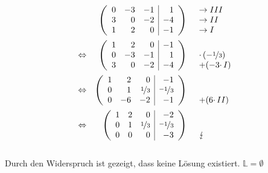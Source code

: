\begin{equation*}
  \begin{array}{ c r l }
    & \left(\begin{array}{rrr|r}
      0 & -3 & -1 & 1\\
      3 & 0 & -2 & -4\\
      1 & 2 & 0 & -1
    \end{array}\right) & \begin{array}{ l }
      \rightarrow III\\
      \rightarrow II\\
      \rightarrow I
    \end{array}\vspace{2mm}\\
    \Leftrightarrow  & \left(\begin{array}{rrr|r}
      1 & 2 & 0 & -1\\
      0 & -3 & -1 & 1\\
      3 & 0 & -2 & -4
    \end{array}\right) & \begin{array}{ l }
      \\
      \cdotp ( -\nicefrac{1}{3})\\
      +( -3\cdotp I)
    \end{array}\vspace{2mm}\\
    \Leftrightarrow  & \left(\begin{array}{rrr|r}
      1 & 2 & 0 & -1\\
      0 & 1 & \nicefrac{1}{3} & \nicefrac{-1}{3}\\
      0 & -6 & -2 & -1
    \end{array}\right) & \begin{array}{ l }
      \\
      \\
      +( 6\cdotp II)
    \end{array}\vspace{2mm}\\
    \Leftrightarrow  & \left(\begin{array}{rrr|r}
      1 & 2 & 0 & -2\\
      0 & 1 & \nicefrac{1}{3} & \nicefrac{-1}{3}\\
      0 & 0 & 0 & -3
    \end{array}\right) & \begin{array}{ l }
      \\
      \\
      \lightning 
    \end{array}
  \end{array}
\end{equation*}
\\
Durch den Widerspruch ist gezeigt, dass keine Lösung existiert. $\mathbb{L}=\emptyset$